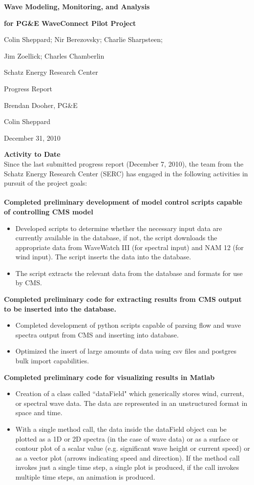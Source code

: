 \documentclass[11pt,letterpaper,oneside,reqno]{article}
\begin{document}
\centerline{\Large \bf Wave Modeling, Monitoring, and Analysis} 
\centerline{\Large \bf for PG\&E WaveConnect Pilot Project}
\centerline{Colin Sheppard; Nir Berezovsky; Charlie Sharpsteen;}
\centerline{Jim Zoellick; Charles Chamberlin}
\centerline{Schatz Energy Research Center}
\bigskip
\bigskip

 Progress Report

 Brendan Dooher, PG\&E

 Colin Sheppard

 December 31, 2010 


\textbf{Activity to Date}\\
Since the last submitted progress report (December 7, 2010), the team from the Schatz Energy Research Center (SERC) has engaged in the following activities in pursuit of the project goals:\\
\\
\textbf{Completed preliminary development of model control scripts capable of controlling CMS model}
\begin{itemize}
\item Developed scripts to determine whether the necessary input data are currently available in the database, if not, the script downloads the appropriate data from WaveWatch III (for spectral input) and NAM 12 (for wind input).  The script inserts the data into the database. 
\item The script extracts the relevant data from the database and formats for use by CMS.
\end{itemize}
\textbf{Completed preliminary code for extracting results from CMS output to be inserted into the database.}
\begin{itemize}
\item Completed development of python scripts capable of parsing flow and wave spectra output from CMS and inserting into database.
\item Optimized the insert of large amounts of data using csv files and postgres bulk import capabilities.
\end{itemize}
\textbf{Completed preliminary code for visualizing results in Matlab}
\begin{itemize}
\item Creation of a class called ``dataField" which generically stores wind, current, or spectral wave data.  The data are represented in an unstructured format in space and time.
\item With a single method call, the data inside the dataField object can be plotted as a 1D or 2D spectra (in the case of wave data) or as a surface or contour plot of a scalar value (e.g. significant wave height or current speed) or as a vector plot (arrows indicating speed and direction).  If the method call invokes just a single time step, a single plot is produced, if the call invokes multiple time steps, an animation is produced.
\end{itemize}
\end{document}
